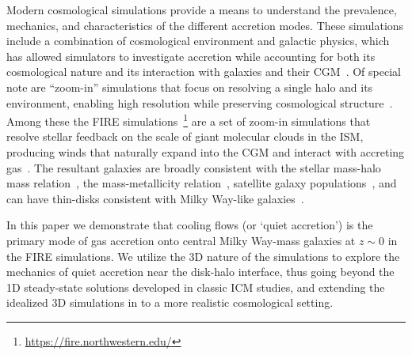 \documentclass[fleqn,usenatbib]{mnras}
\begin{document}

Modern cosmological simulations provide a means to understand the prevalence, mechanics, and characteristics of the different accretion modes.
These simulations include a combination of cosmological environment and galactic physics, which has allowed simulators to investigate accretion while accounting for both its cosmological nature and its interaction with galaxies and their CGM~\citep[e.g.][]{Oppenheimer2010, Stewart2011, Fernandez2012, Ford2014, Angles-Alcazar2017, Hafen2019, Hafen2020, Ho2019, Rottgers2020, Trapp2021}.
Of special note are ``zoom-in'' simulations that focus on resolving a single halo and its environment, enabling high resolution while preserving cosmological structure~\citep[e.g.][]{Katz1993, Hopkins2014, Hopkins2018, Wang2015, Agertz2020}.
Among these the FIRE simulations~\citep{Hopkins2014, Hopkins2017}\footnote{\url{https://fire.northwestern.edu/}} are a set of zoom-in simulations that resolve stellar feedback on the scale of giant molecular clouds in the ISM, producing winds that naturally expand into the CGM and interact with accreting gas~\citep{Muratov2015, Muratov2017, Hafen2019, Hafen2020}.
The resultant galaxies are broadly consistent with the stellar mass-halo mass relation~\citep{Hopkins2017}, the mass-metallicity relation~\citep{Ma2016a}, satellite galaxy populations~\citep{Wetzel2016, Garrison-Kimmel2019a}, and can have thin-disks consistent with Milky Way-like galaxies~\citep{Garrison-Kimmel2018, El-Badry2018}.

In this paper we demonstrate that cooling flows (or `quiet accretion') is the primary mode of gas accretion onto central Milky Way-mass galaxies at $z \sim 0$ in the FIRE simulations. 
We utilize the 3D nature of the simulations to explore the mechanics of quiet accretion near the disk-halo interface, thus going beyond the 1D steady-state solutions developed in classic ICM studies, and extending the idealized 3D simulations in \cite{Stern2020} to a more realistic cosmological setting. 
\end{document}
